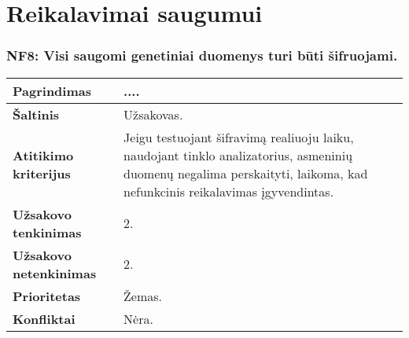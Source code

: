 \documentclass[12pt]{article}
\begin{document}
\section{Reikalavimai saugumui}

\subsubsection*{NF8: Visi saugomi genetiniai duomenys turi būti šifruojami.}
\label{sec:NF8}
\begin{table}[htb!]
    \captionsetup{justification=centering}
    \begin{tabular}{|m{4.9cm}|m{11cm}|}
        \hline
        \raggedleft \textbf{\cellcolor{orange!30}Pagrindimas} &
        .... \\
        \hline
        \raggedleft \textbf{\cellcolor{orange!30}Šaltinis} & Užsakovas. \\
        \hline
        \raggedleft \textbf{\cellcolor{orange!30}Atitikimo kriterijus} & 
        Jeigu testuojant šifravimą realiuoju laiku, naudojant tinklo
        analizatorius, asmeninių duomenų negalima perskaityti, laikoma, kad
        nefunkcinis reikalavimas įgyvendintas. \\
        \hline
        \raggedleft \textbf{\cellcolor{orange!30}Užsakovo tenkinimas} & 2. \\
        \hline
        \raggedleft \textbf{\cellcolor{orange!30}Užsakovo netenkinimas} & 2. \\
        \hline
        \raggedleft \textbf{\cellcolor{orange!30}Prioritetas} & Žemas. \\
        \hline
        \raggedleft \textbf{\cellcolor{orange!30}Konfliktai} & Nėra. \\
        \hline
    \end{tabular}
\end{table}

\newpage
\end{document}
